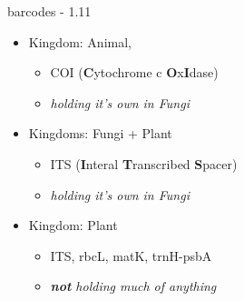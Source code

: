 \documentclass[
  ignorenonframetext,
]{beamer}
\providecommand{\tightlist}{%
  \setlength{\itemsep}{0pt}\setlength{\parskip}{0pt}}
\begin{document}
\begin{frame}{barcodes - 1.11}
\protect\hypertarget{barcodes---1.11}{}
\begin{itemize}
\tightlist
\item
  Kingdom: Animal,

  \begin{itemize}
  \tightlist
  \item
    COI (\textbf{C}ytochrome c \textbf{O}x\textbf{I}dase)
  \item
    \emph{holding it's own in Fungi}
  \end{itemize}
\item
  Kingdoms: Fungi + Plant

  \begin{itemize}
  \tightlist
  \item
    ITS (\textbf{I}nteral \textbf{T}ranscribed \textbf{S}pacer)
  \item
    \emph{holding it's own in Fungi}
  \end{itemize}
\item
  Kingdom: Plant

  \begin{itemize}
  \tightlist
  \item
    ITS, rbcL, matK, trnH-psbA
  \item
    \emph{\textbf{not} holding much of anything}
  \end{itemize}
\end{itemize}
\end{frame}
\end{document}
